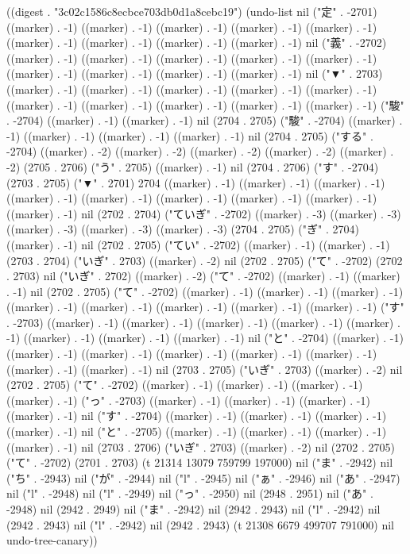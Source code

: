 
((digest . "3c02c1586c8ecbce703db0d1a8cebc19") (undo-list nil ("定" . -2701) ((marker) . -1) ((marker) . -1) ((marker) . -1) ((marker) . -1) ((marker) . -1) ((marker) . -1) ((marker) . -1) ((marker) . -1) ((marker) . -1) nil ("義" . -2702) ((marker) . -1) ((marker) . -1) ((marker) . -1) ((marker) . -1) ((marker) . -1) ((marker) . -1) ((marker) . -1) ((marker) . -1) ((marker) . -1) nil ("▼" . 2703) ((marker) . -1) ((marker) . -1) ((marker) . -1) ((marker) . -1) ((marker) . -1) ((marker) . -1) ((marker) . -1) ((marker) . -1) ((marker) . -1) ((marker) . -1) ("駿" . -2704) ((marker) . -1) ((marker) . -1) nil (2704 . 2705) ("駿" . -2704) ((marker) . -1) ((marker) . -1) ((marker) . -1) ((marker) . -1) nil (2704 . 2705) ("する" . -2704) ((marker) . -2) ((marker) . -2) ((marker) . -2) ((marker) . -2) ((marker) . -2) (2705 . 2706) ("う" . 2705) ((marker) . -1) nil (2704 . 2706) ("す" . -2704) (2703 . 2705) ("▼" . 2701) 2704 ((marker) . -1) ((marker) . -1) ((marker) . -1) ((marker) . -1) ((marker) . -1) ((marker) . -1) ((marker) . -1) ((marker) . -1) ((marker) . -1) nil (2702 . 2704) ("ていぎ" . -2702) ((marker) . -3) ((marker) . -3) ((marker) . -3) ((marker) . -3) ((marker) . -3) (2704 . 2705) ("ぎ" . 2704) ((marker) . -1) nil (2702 . 2705) ("てい" . -2702) ((marker) . -1) ((marker) . -1) (2703 . 2704) ("いぎ" . 2703) ((marker) . -2) nil (2702 . 2705) ("て" . -2702) (2702 . 2703) nil ("いぎ" . 2702) ((marker) . -2) ("て" . -2702) ((marker) . -1) ((marker) . -1) nil (2702 . 2705) ("て" . -2702) ((marker) . -1) ((marker) . -1) ((marker) . -1) ((marker) . -1) ((marker) . -1) ((marker) . -1) ((marker) . -1) ((marker) . -1) ("す" . -2703) ((marker) . -1) ((marker) . -1) ((marker) . -1) ((marker) . -1) ((marker) . -1) ((marker) . -1) ((marker) . -1) ((marker) . -1) nil ("と" . -2704) ((marker) . -1) ((marker) . -1) ((marker) . -1) ((marker) . -1) ((marker) . -1) ((marker) . -1) ((marker) . -1) ((marker) . -1) nil (2703 . 2705) ("いぎ" . 2703) ((marker) . -2) nil (2702 . 2705) ("て" . -2702) ((marker) . -1) ((marker) . -1) ((marker) . -1) ((marker) . -1) ("っ" . -2703) ((marker) . -1) ((marker) . -1) ((marker) . -1) ((marker) . -1) nil ("す" . -2704) ((marker) . -1) ((marker) . -1) ((marker) . -1) ((marker) . -1) nil ("と" . -2705) ((marker) . -1) ((marker) . -1) ((marker) . -1) ((marker) . -1) nil (2703 . 2706) ("いぎ" . 2703) ((marker) . -2) nil (2702 . 2705) ("て" . -2702) (2701 . 2703) (t 21314 13079 759799 197000) nil ("ま" . -2942) nil ("ち" . -2943) nil ("が" . -2944) nil ("l" . -2945) nil ("ぁ" . -2946) nil ("あ" . -2947) nil ("l" . -2948) nil ("l" . -2949) nil ("っ" . -2950) nil (2948 . 2951) nil ("あ" . -2948) nil (2942 . 2949) nil ("ま" . -2942) nil (2942 . 2943) nil ("l" . -2942) nil (2942 . 2943) nil ("l" . -2942) nil (2942 . 2943) (t 21308 6679 499707 791000) nil undo-tree-canary))
